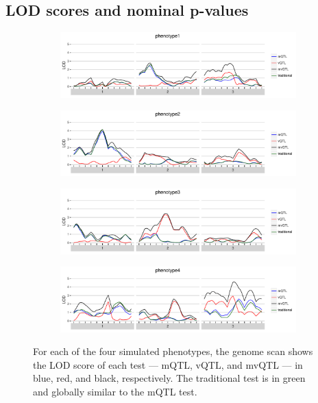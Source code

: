 \subsection{LOD scores and nominal p-values}

\begin{figure}
    \begin{subfigure}[b]{\linewidth}
        \includegraphics[width=\textwidth]{images/LOD_scan_phenotype1.pdf}
    \end{subfigure}
    \begin{subfigure}[b]{\linewidth}
        \includegraphics[width=\textwidth]{images/LOD_scan_phenotype2.pdf}
    \end{subfigure}
    \begin{subfigure}[b]{\linewidth}
        \includegraphics[width=\textwidth]{images/LOD_scan_phenotype3.pdf}
    \end{subfigure}
    \begin{subfigure}[b]{\linewidth}
        \includegraphics[width=\textwidth]{images/LOD_scan_phenotype4.pdf}
    \end{subfigure}
    \caption[
        LOD score of each test for each of the four simulated phenotypes.
    ]
    {
        For each of the four simulated phenotypes, the genome scan shows the LOD score of each test --- mQTL, vQTL, and mvQTL --- in blue, red, and black, respectively.
        The traditional test is in green and globally similar to the mQTL test.
    }
    \label{fig:lod_score_scans}
\end{figure}


